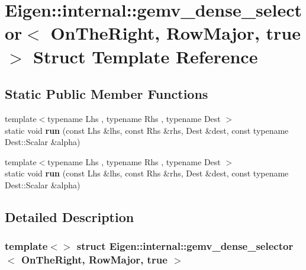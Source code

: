 \hypertarget{struct_eigen_1_1internal_1_1gemv__dense__selector_3_01_on_the_right_00_01_row_major_00_01true_01_4}{}\section{Eigen\+:\+:internal\+:\+:gemv\+\_\+dense\+\_\+selector$<$ On\+The\+Right, Row\+Major, true $>$ Struct Template Reference}
\label{struct_eigen_1_1internal_1_1gemv__dense__selector_3_01_on_the_right_00_01_row_major_00_01true_01_4}
\subsection*{Static Public Member Functions}
\begin{DoxyCompactItemize}
\item 
\mbox{\label{struct_eigen_1_1internal_1_1gemv__dense__selector_3_01_on_the_right_00_01_row_major_00_01true_01_4_a58d2254655edbf6807aa0b60906ef5f9}} 
{\footnotesize template$<$typename Lhs , typename Rhs , typename Dest $>$ }\\static void {\bfseries run} (const Lhs \&lhs, const Rhs \&rhs, Dest \&dest, const typename Dest\+::\+Scalar \&alpha)
\item 
\mbox{\label{struct_eigen_1_1internal_1_1gemv__dense__selector_3_01_on_the_right_00_01_row_major_00_01true_01_4_a58d2254655edbf6807aa0b60906ef5f9}} 
{\footnotesize template$<$typename Lhs , typename Rhs , typename Dest $>$ }\\static void {\bfseries run} (const Lhs \&lhs, const Rhs \&rhs, Dest \&dest, const typename Dest\+::\+Scalar \&alpha)
\end{DoxyCompactItemize}


\subsection{Detailed Description}
\subsubsection*{template$<$$>$\newline
struct Eigen\+::internal\+::gemv\+\_\+dense\+\_\+selector$<$ On\+The\+Right, Row\+Major, true $>$}




